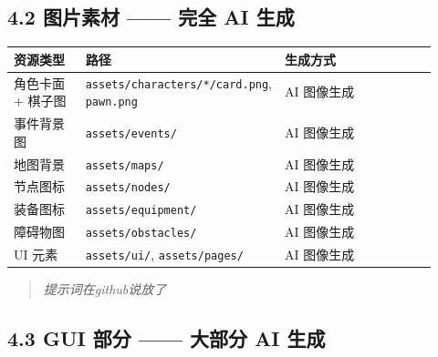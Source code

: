 \documentclass[UTF8,10pt]{ctexart}
\begin{document}
\subsection*{4.2 图片素材 —— 完全 AI 生成}

{\small
\begin{longtable}{p{0.22\linewidth}p{0.20\linewidth}p{0.50\linewidth}}
\toprule
\textbf{资源类型} & \textbf{路径} & \textbf{生成方式} \\
\midrule
角色卡面 + 棋子图 & \texttt{assets/\allowbreak{}characters/\allowbreak{}*/\allowbreak{}card.\allowbreak{}png}, \texttt{pawn.\allowbreak{}png} & AI 图像生成 \\
事件背景图 & \texttt{assets/\allowbreak{}events/\allowbreak{}} & AI 图像生成 \\
地图背景 & \texttt{assets/\allowbreak{}maps/\allowbreak{}} & AI 图像生成 \\
节点图标 & \texttt{assets/\allowbreak{}nodes/\allowbreak{}} & AI 图像生成 \\
装备图标 & \texttt{assets/\allowbreak{}equipment/\allowbreak{}} & AI 图像生成 \\
障碍物图 & \texttt{assets/\allowbreak{}obstacles/\allowbreak{}} & AI 图像生成 \\
UI 元素 & \texttt{assets/\allowbreak{}ui/\allowbreak{}}, \texttt{assets/\allowbreak{}pages/\allowbreak{}} & AI 图像生成 \\
\bottomrule
\end{longtable}
}

\begin{quote}\itshape 提示词在github说放了\end{quote}

\subsection*{4.3 GUI 部分 —— 大部分 AI 生成}
\end{document}
